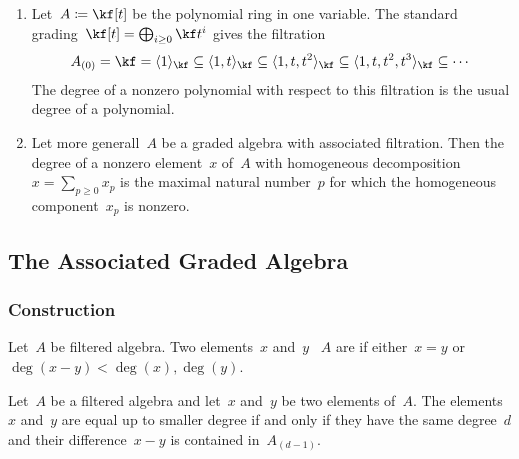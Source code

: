 \begin{example}
  \leavevmode
  \begin{enumerate}
    \item
      Let~$A \defined \kf[t]$ be the polynomial ring in one variable.
      The standard grading~$\kf[t] = \bigoplus_{i \geq 0} \kf t^i$ gives the filtration
      \[
        A_{(0)}
        =
        \kf
        =
        \gen{ 1 }_{\kf}
        \subseteq
        \gen{ 1, t }_{\kf}
        \subseteq
        \gen{ 1, t, t^2 }_{\kf}
        \subseteq
        \gen{ 1, t, t^2, t^3 }_{\kf}
        \subseteq
        \dotsb
      \]
      The degree of a nonzero polynomial with respect to this filtration is the usual degree of a polynomial.
    \item
      Let more generall~$A$ be a graded algebra with associated filtration.
      Then the degree of a nonzero element~$x$ of~$A$ with homogeneous decomposition~$x = \sum_{p \geq 0} x_p$ is the maximal natural number~$p$ for which the homogeneous component~$x_p$ is nonzero.
  \end{enumerate}
\end{example}



\subsection{The Associated Graded Algebra}

\subsubsection{Construction}

\begin{definition}
  Let~$A$ be filtered algebra.
  Two elements~$x$ and~$y$ ~$A$ are  if either~$x = y$ or~$\deg(x-y) < \deg(x), \deg(y)$.
\end{definition}


\begin{proposition}
  Let~$A$ be a filtered algebra and let~$x$ and~$y$ be two elements of~$A$.
  The elements~$x$ and~$y$ are equal up to smaller degree if and only if they have the same degree~$d$ and their difference~$x - y$ is contained in~$A_{(d-1)}$.
\end{proposition}


